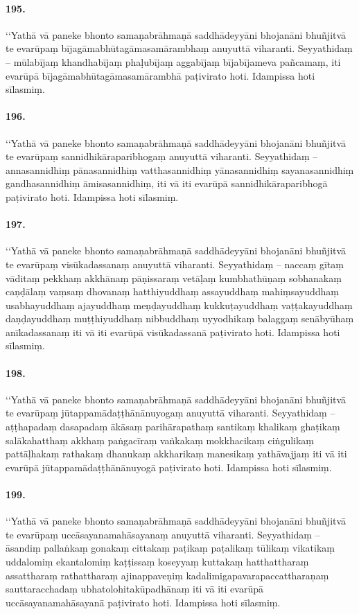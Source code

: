 \paragraph{195.} ‘‘Yathā vā paneke bhonto samaṇabrāhmaṇā saddhādeyyāni bhojanāni bhuñjitvā te evarūpaṃ bījagāmabhūtagāmasamārambhaṃ anuyuttā viharanti. Seyyathidaṃ – mūlabījaṃ khandhabījaṃ phaḷubījaṃ aggabījaṃ bījabījameva pañcamaṃ, iti evarūpā bījagāmabhūtagāmasamārambhā paṭivirato hoti. Idampissa hoti sīlasmiṃ.

\paragraph{196.} ‘‘Yathā vā paneke bhonto samaṇabrāhmaṇā saddhādeyyāni bhojanāni bhuñjitvā te evarūpaṃ sannidhikāraparibhogaṃ anuyuttā viharanti. Seyyathidaṃ – annasannidhiṃ pānasannidhiṃ vatthasannidhiṃ yānasannidhiṃ sayanasannidhiṃ gandhasannidhiṃ āmisasannidhiṃ, iti vā iti evarūpā sannidhikāraparibhogā paṭivirato hoti. Idampissa hoti sīlasmiṃ.

\paragraph{197.} ‘‘Yathā vā paneke bhonto samaṇabrāhmaṇā saddhādeyyāni bhojanāni bhuñjitvā te evarūpaṃ visūkadassanaṃ anuyuttā viharanti. Seyyathidaṃ – naccaṃ gītaṃ vāditaṃ pekkhaṃ akkhānaṃ pāṇissaraṃ vetāḷaṃ kumbhathūṇaṃ sobhanakaṃ caṇḍālaṃ vaṃsaṃ dhovanaṃ hatthiyuddhaṃ assayuddhaṃ mahiṃsayuddhaṃ usabhayuddhaṃ ajayuddhaṃ meṇḍayuddhaṃ kukkuṭayuddhaṃ vaṭṭakayuddhaṃ daṇḍayuddhaṃ muṭṭhiyuddhaṃ nibbuddhaṃ uyyodhikaṃ balaggaṃ senābyūhaṃ anīkadassanaṃ iti vā iti evarūpā visūkadassanā paṭivirato hoti. Idampissa hoti sīlasmiṃ.

\paragraph{198.} ‘‘Yathā vā paneke bhonto samaṇabrāhmaṇā saddhādeyyāni bhojanāni bhuñjitvā te evarūpaṃ jūtappamādaṭṭhānānuyogaṃ anuyuttā viharanti. Seyyathidaṃ – aṭṭhapadaṃ dasapadaṃ ākāsaṃ parihārapathaṃ santikaṃ khalikaṃ ghaṭikaṃ salākahatthaṃ akkhaṃ paṅgacīraṃ vaṅkakaṃ mokkhacikaṃ ciṅgulikaṃ pattāḷhakaṃ rathakaṃ dhanukaṃ akkharikaṃ manesikaṃ yathāvajjaṃ iti vā iti evarūpā jūtappamādaṭṭhānānuyogā paṭivirato hoti. Idampissa hoti sīlasmiṃ.

\paragraph{199.} ‘‘Yathā vā paneke bhonto samaṇabrāhmaṇā saddhādeyyāni bhojanāni bhuñjitvā te evarūpaṃ uccāsayanamahāsayanaṃ anuyuttā viharanti. Seyyathidaṃ – āsandiṃ pallaṅkaṃ gonakaṃ cittakaṃ paṭikaṃ paṭalikaṃ tūlikaṃ vikatikaṃ uddalomiṃ ekantalomiṃ kaṭṭissaṃ koseyyaṃ kuttakaṃ hatthattharaṃ assattharaṃ rathattharaṃ ajinappaveṇiṃ kadalimigapavarapaccattharaṇaṃ sauttaracchadaṃ ubhatolohitakūpadhānaṃ iti vā iti evarūpā uccāsayanamahāsayanā paṭivirato hoti. Idampissa hoti sīlasmiṃ.

